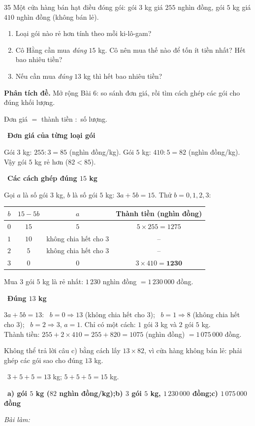 \documentclass[11pt]{article}
\newif\ifsol \solfalse
\providecommand{\AnsWord}{Đáp số}
\newcommand{\ans}[1]{\par\smallskip{\bfseries\color{tmGreen!88!black}\AnsWord:}\ {\bfseries\color{AnsRed}#1}\par}
\newcommand{\probsol}[1]{%
  \begin{lrbox}{\solmeasure}\begin{minipage}{\dimexpr\linewidth-24pt\relax}#1\end{minipage}\end{lrbox}%
  \ifsol
    \begin{solbox}#1\end{solbox}%
  \else
    \setlength{\solht}{\dimexpr\ht\solmeasure+\dp\solmeasure+0.85cm\relax}%
    \ifdim\solht<1.35cm\setlength{\solht}{1.35cm}\fi
    \ifdim\solht>\StudentMaxWork\setlength{\solht}{\StudentMaxWork}\fi
    \begin{tcolorbox}[colback=white,colframe=Line,boxrule=0.8pt,arc=5pt,
      left=8pt,right=8pt,top=4pt,bottom=4pt,height=\solht]{\footnotesize\color{Slate}\itshape\WorkWord}\end{tcolorbox}%
  \fi}
\newlength{\StudentMaxWork}\setlength{\StudentMaxWork}{7.5cm}
\newcommand{\step}[2]{\par\smallskip\noindent{\bfseries\color{tmBlue!85!black}\StepWord~#1.}\ {\bfseries #2}\par\nopagebreak}
\newcommand{\verify}[1]{\par\smallskip\noindent{\bfseries\color{tmGreen!80!black}\faCheckCircle\ \CheckWord}\ #1\par}
\def\WorkWord{Bài làm:}
\def\AnsWord{Đáp số}
\def\StepWord{Bước}
\def\CheckWord{Thử lại:}
\begin{document}
\begin{probbox}{35}{\relax}
Một cửa hàng bán hạt điều đóng gói: gói $3$ kg giá $255$ nghìn đồng, gói $5$ kg giá $410$ nghìn đồng (không bán lẻ).
\begin{enumerate}[label=\alph*),leftmargin=1.6em,itemsep=0pt,topsep=2pt]
  \item Loại gói nào rẻ hơn tính theo mỗi ki-lô-gam?
  \item Cô Hằng cần mua \emph{đúng} $15$ kg. Cô nên mua thế nào để tốn ít tiền nhất? Hết bao nhiêu tiền?
  \item Nếu cần mua \emph{đúng} $13$ kg thì hết bao nhiêu tiền?
\end{enumerate}
\end{probbox}
\probsol{
\textbf{Phân tích đề.} Mở rộng Bài 6: so sánh đơn giá, rồi tìm cách ghép các gói cho đúng khối lượng.
\begin{recallbox}Đơn giá $=$ thành tiền $:$ số lượng.\end{recallbox}
\step{1}{Đơn giá của từng loại gói}
Gói $3$ kg: $255 : 3 = 85$ (nghìn đồng/kg). \quad Gói $5$ kg: $410 : 5 = 82$ (nghìn đồng/kg).\\
Vậy gói $5$ kg rẻ hơn ($82 < 85$).
\step{2}{Các cách ghép đúng $15$ kg}
Gọi $a$ là số gói $3$ kg, $b$ là số gói $5$ kg: $3a + 5b = 15$. Thử $b = 0, 1, 2, 3$:
\begin{center}
\begin{tabular}{|c|c|c|c|}
\hline
\rowcolor{tmBlue!10} $b$ & $15 - 5b$ & $a$ & Thành tiền (nghìn đồng)\\ \hline
$0$ & $15$ & $5$ & $5\times 255 = 1275$\\ \hline
$1$ & $10$ & không chia hết cho $3$ & --\\ \hline
$2$ & $5$ & không chia hết cho $3$ & --\\ \hline
$3$ & $0$ & $0$ & $3\times 410 = \mathbf{1230}$\\ \hline
\end{tabular}
\end{center}
Mua $3$ gói $5$ kg là rẻ nhất: $1\,230$ nghìn đồng $= 1\,230\,000$ đồng.
\step{3}{Đúng $13$ kg}
$3a + 5b = 13$: \ $b = 0 \Rightarrow 13$ (không chia hết cho $3$); \ $b = 1 \Rightarrow 8$ (không chia hết cho $3$);
\ $b = 2 \Rightarrow 3$, $a = 1$. Chỉ có một cách: $1$ gói $3$ kg và $2$ gói $5$ kg.\\
Thành tiền: $255 + 2\times 410 = 255 + 820 = 1075$ (nghìn đồng) $= 1\,075\,000$ đồng.
\begin{warnbox}Không thể trả lời câu c) bằng cách lấy $13\times 82$, vì cửa hàng không bán lẻ: phải ghép các gói sao cho
đúng $13$ kg.\end{warnbox}
\verify{$3 + 5 + 5 = 13$ kg; $5 + 5 + 5 = 15$ kg.}
\ans{a) gói $5$ kg ($82$ nghìn đồng/kg);\quad b) $3$ gói $5$ kg, $1\,230\,000$ đồng;\quad c) $1\,075\,000$ đồng}
}
\end{document}
